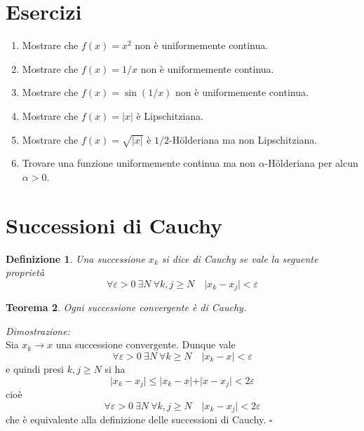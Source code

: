\documentclass[italian,a4paper]{article}
\renewcommand{\epsilon}{\varepsilon}
\newtheorem{theorem}{Teorema}
\newtheorem{definition}[theorem]{Definizione}
\newenvironment{proof}
        {%
                {}%
                {%
                }%
        \noindent%
        {\it Dimostrazione:}\\%
        }%
        {%
        \hfill$\square$%
        }
\begin{document}
\section{Esercizi}
\begin{enumerate}
\item
Mostrare che $f(x)=x^2$ non \`e uniformemente continua.
\item
Mostrare che $f(x)=1/x$ non \`e uniformemente continua.
\item
Mostrare che $f(x)=\sin(1/x)$ non \`e uniformemente continua.
\item
Mostrare che $f(x)=\vert x \vert$ \`e Lipschitziana.
\item
Mostrare che $f(x)=\sqrt{\vert x\vert}$ \`e $1/2$-H\"o{}lderiana ma
non Lipschitziana.
\item
Trovare una funzione uniformemente continua ma non
$\alpha$-H\"o{}lderiana per alcun $\alpha>0$.
\end{enumerate}

\section{Successioni di Cauchy}

\begin{definition}
Una successione $x_k$ si dice \emph{di Cauchy} se vale la seguente
propriet\`a
\[
	\forall \epsilon>0\ \exists N\ 
	\forall k,j\ge N\quad \vert x_k-x_j\vert < \epsilon
\]
\end{definition}

\begin{theorem}
Ogni successione convergente \`e di Cauchy.
\end{theorem}
\begin{proof}
Sia $x_k\to x$ una successione convergente. Dunque vale
\[
	\forall \epsilon>0\ \exists N\ 
	\forall k\ge N \quad \vert x_k - x \vert < \epsilon
\]
e quindi presi $k,j\ge N$ si ha 
\[
	\vert x_k - x_j\vert \le \vert x_k - x\vert + \vert x-
	x_j\vert
	< 2 \epsilon
\]
cio\`e
\[
	\forall \epsilon>0\ \exists N\ 
	\forall k,j\ge N \quad \vert x_k - x_j\vert < 2\epsilon
\]
che \`e equivalente alla definizione delle successioni di Cauchy.
\end{proof}
\end{document}
